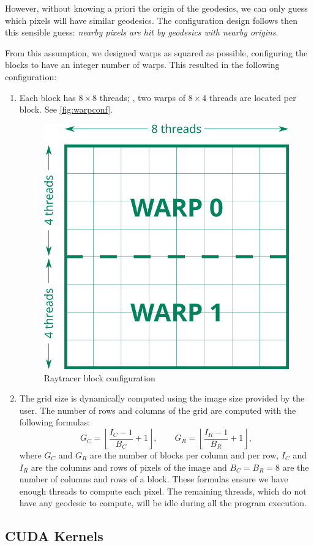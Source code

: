 However, without knowing a priori the origin of the geodesics, we can only guess which pixels will have similar geodesics. The configuration design follows then this sensible guess: \emph{nearby pixels are hit by geodesics with nearby origins}.

From this assumption, we designed warps as squared as possible, configuring the blocks to have an integer number of warps. This resulted in the following configuration:
\begin{enumerate}
	\item Each block has $8\times8$ threads; \ie, two warps of $8\times4$ threads are located per block. See \autoref{fig:warpconf}.
	\begin{figure}[bth]
		\myfloatalign
		\includegraphics[width=.5\linewidth]{gfx/warpconf.png}
		\caption[Raytracer block configuration]{Raytracer block configuration}
		\label{fig:warpconf}
	\end{figure}
	\item The grid size is dynamically computed using the image size provided by the user. The number of rows and columns of the grid are computed with the following formulas:
	\begin{equation*}
	G_C = \left \lfloor{\frac{I_C - 1}{B_C} + 1}\right \rfloor, \qquad
	G_R = \left \lfloor{\frac{I_R - 1}{B_R} + 1}\right \rfloor,
	\end{equation*}
	where $G_C$ and $G_R$ are the number of blocks per column and per row, $I_C$ and $I_R$ are the columns and rows of pixels of the image and $B_C = B_R = 8$ are the number of columns and rows of a block. These formulas ensure we have enough threads to compute each pixel. The remaining threads, which do not have any geodesic to compute, will be idle during all the program execution.
\end{enumerate}

\subsection{CUDA Kernels}

